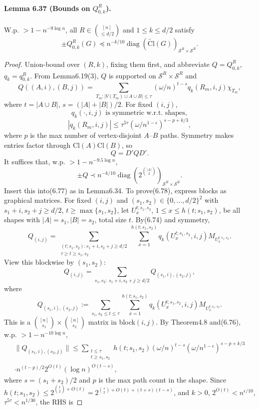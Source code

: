 \documentclass[10pt,a4paper]{article}
\begin{document}
\paragraph{Lemma 6.37 (Bounds on $Q_{0,k}^R$).} W.p. $>1-n^{-9\log n}$, all $R\in\binom{[n]}{\le d/2}$ and $1\le k\le d/2$ satisfy
\[\pm Q_{0,k}^R(G)\preceq n^{-k/10}\operatorname{diag}(\widetilde{\mathrm{Cl}}(G))_{\mathcal S^R\times\mathcal S^R}.\]
\begin{proof}Union-bound over $(R,k)$, fixing them first, and abbreviate $Q=Q_{0,k}^R$, $q_k=q_{0,k}^R$. From Lemma6.19(3), $Q$ is supported on $\mathcal S^R\times\mathcal S^R$ and
\[Q((A,i),(B,j))=\sum_{T_m:|V(T_m)\cup A\cup B|\le\tau}(\omega/n)^{t-s}q_k(R_m,i,j)\chi_{T_m},\tag{6.74}\]
where $t=|A\cup B|$, $s=(|A|+|B|)/2$. For fixed $(i,j)$,
\[q_k(\cdot,i,j)\text{ is symmetric w.r.t. shapes},\tag{6.75}\]
\[|q_k(R_m,i,j)|\le\tau^{5\tau}(\omega/n^{1-\epsilon})^{s-p+k/3},\tag{6.76}\]
where $p$ is the max number of vertex-disjoint $A$--$B$ paths. Symmetry makes entries factor through $\mathrm{Cl}(A)\mathrm{Cl}(B)$, so
\[Q=D'QD'.\tag{6.77}\]
It suffices that, w.p. $>1-n^{-9.5\log n}$,
\[\pm Q\prec n^{-k/10}\operatorname{diag}(2^{\binom{|A|}2})_{\mathcal S^R\times\mathcal S^R}.\tag{6.78}\]
Insert this into(6.77) as in Lemma6.34. To prove(6.78), express blocks as graphical matrices. For fixed $(i,j)$ and $(s_1,s_2)\in\{0,\ldots,d/2\}^2$ with $s_1+i,s_2+j\ge d/2$, $t\ge\max\{s_1,s_2\}$, let $U_x^{t;s_1,s_2}$, $1\le x\le h(t;s_1,s_2)$, be all shapes with $|A|=s_1,|B|=s_2$, total size $t$. By(6.74) and symmetry,
\[Q_{(i,j)}=\sum_{\substack{(t;s_1,s_2)\colon s_1+i,s_2+j\ge d/2\\\tau\ge t\ge s_1,s_2}}\sum_{x=1}^{h(t;s_1,s_2)}q_k(U_x^{t;s_1,s_2},i,j)M_{U_x^{t;s_1,s_2}}.\]
View this blockwise by $(s_1,s_2)$:
\[Q_{(i,j)}=\sum_{s_1,s_2:\ s_1+i,s_2+j\ge d/2}Q_{(s_1,i),(s_2,j)},\tag{6.79}\]
where
\[Q_{(s_1,i),(s_2,j)}:=\sum_{s_1,s_2\le t\le\tau}\sum_{x=1}^{h(t;s_1,s_2)}q_k(U_x^{t;s_1,s_2},i,j)M_{U_x^{t;s_1,s_2}}.\tag{6.80}\]
This is a $\binom{[n]}{s_1}\times\binom{[n]}{s_2}$ matrix in block$(i,j)$. By Theorem4.8 and(6.76), w.p. $>1-n^{-10\log n}$,
\begin{multline*}\|Q_{(s_1,i),(s_2,j)}\|\le\sum_{\substack{t\le\tau\\t\ge s_1,s_2}}h(t;s_1,s_2)(\omega/n)^{t-s}(\omega/n^{1-\epsilon})^{s-p+k/3}\\\cdot n^{(t-p)/2}2^{O(t)}(\log n)^{O(t-s)},\tag{6.81}\end{multline*}
where $s=(s_1+s_2)/2$ and $p$ is the max path count in the shape. Since $h(t;s_1,s_2)\le2^{\binom t2+O(t)}=2^{\binom s2+O(t)+(t+s)(t-s)}$, and $k>0$, $2^{O(t)}<n^{\epsilon/10}$, $\tau^{5\tau}<n^{1/30}$, the RHS is

\end{proof}
\end{document}
